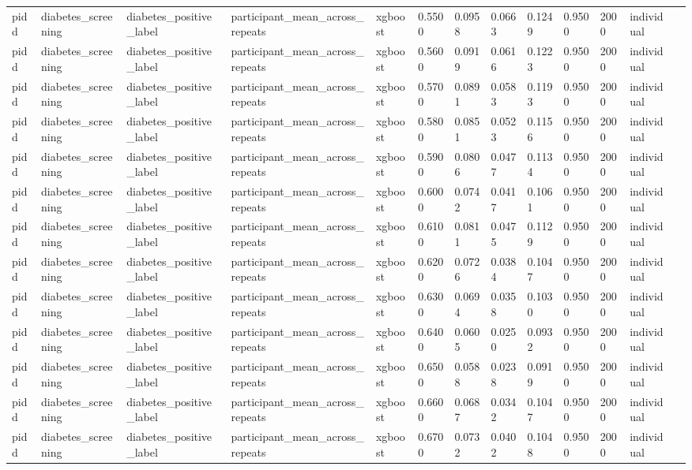 \begin{tabular}{lllllllllllll}
pidd & diabetes\_screening & diabetes\_positive\_label & participant\_mean\_across\_repeats & xgboost & 0.5500 & 0.0958 & 0.0663 & 0.1249 & 0.9500 & 2000 & individual &  \\
pidd & diabetes\_screening & diabetes\_positive\_label & participant\_mean\_across\_repeats & xgboost & 0.5600 & 0.0919 & 0.0616 & 0.1223 & 0.9500 & 2000 & individual &  \\
pidd & diabetes\_screening & diabetes\_positive\_label & participant\_mean\_across\_repeats & xgboost & 0.5700 & 0.0891 & 0.0583 & 0.1193 & 0.9500 & 2000 & individual &  \\
pidd & diabetes\_screening & diabetes\_positive\_label & participant\_mean\_across\_repeats & xgboost & 0.5800 & 0.0851 & 0.0523 & 0.1156 & 0.9500 & 2000 & individual &  \\
pidd & diabetes\_screening & diabetes\_positive\_label & participant\_mean\_across\_repeats & xgboost & 0.5900 & 0.0806 & 0.0477 & 0.1134 & 0.9500 & 2000 & individual &  \\
pidd & diabetes\_screening & diabetes\_positive\_label & participant\_mean\_across\_repeats & xgboost & 0.6000 & 0.0742 & 0.0417 & 0.1061 & 0.9500 & 2000 & individual &  \\
pidd & diabetes\_screening & diabetes\_positive\_label & participant\_mean\_across\_repeats & xgboost & 0.6100 & 0.0811 & 0.0475 & 0.1129 & 0.9500 & 2000 & individual &  \\
pidd & diabetes\_screening & diabetes\_positive\_label & participant\_mean\_across\_repeats & xgboost & 0.6200 & 0.0726 & 0.0384 & 0.1047 & 0.9500 & 2000 & individual &  \\
pidd & diabetes\_screening & diabetes\_positive\_label & participant\_mean\_across\_repeats & xgboost & 0.6300 & 0.0694 & 0.0358 & 0.1030 & 0.9500 & 2000 & individual &  \\
pidd & diabetes\_screening & diabetes\_positive\_label & participant\_mean\_across\_repeats & xgboost & 0.6400 & 0.0605 & 0.0250 & 0.0932 & 0.9500 & 2000 & individual &  \\
pidd & diabetes\_screening & diabetes\_positive\_label & participant\_mean\_across\_repeats & xgboost & 0.6500 & 0.0588 & 0.0238 & 0.0919 & 0.9500 & 2000 & individual &  \\
pidd & diabetes\_screening & diabetes\_positive\_label & participant\_mean\_across\_repeats & xgboost & 0.6600 & 0.0687 & 0.0342 & 0.1047 & 0.9500 & 2000 & individual &  \\
pidd & diabetes\_screening & diabetes\_positive\_label & participant\_mean\_across\_repeats & xgboost & 0.6700 & 0.0732 & 0.0402 & 0.1048 & 0.9500 & 2000 & individual &  \\

\end{tabular}
